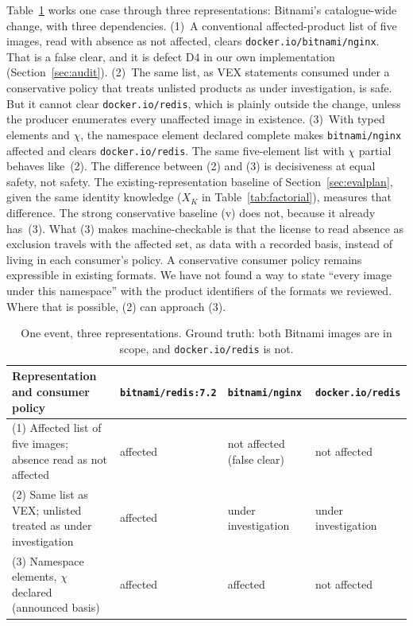 \documentclass[11pt,a4paper]{article}
\newcommand{\code}[1]{\texttt{#1}}
\begin{document}
Table~\ref{tab:vexcmp} works one case through three representations:
Bitnami's catalogue-wide change, with three dependencies. (1)~A
conventional affected-product list of five images, read with
absence as not affected, clears \code{docker.io/bitnami/nginx}. That is
a false clear, and it is defect D4 in our own implementation
(Section~\ref{sec:audit}). (2)~The same list, as VEX statements
consumed under a conservative policy that treats unlisted products as
under investigation, is safe. But it cannot clear
\code{docker.io/redis}, which is plainly outside the change, unless the
producer enumerates every unaffected image in existence. (3)~With typed
elements and $\chi$, the namespace element declared complete makes
\code{bitnami/nginx} affected and clears \code{docker.io/redis}. The
same five-element list with $\chi$ partial behaves like~(2). The
difference between (2) and (3) is decisiveness at equal safety, not
safety. The existing-representation baseline of
Section~\ref{sec:evalplan}, given the same identity knowledge
($X_K$ in Table~\ref{tab:factorial}), measures that difference. The strong
conservative baseline (v) does not, because it already has~(3). What (3) makes
machine-checkable is that the license to read absence as exclusion
travels with the affected set, as data with a recorded basis, instead
of living in each consumer's policy. A conservative consumer policy
remains expressible in existing formats. We have not found a way to
state ``every image under this namespace'' with the product
identifiers of the formats we reviewed. Where that is possible, (2)
can approach (3).

\begin{table}[t]
\centering
\footnotesize
\begin{tabularx}{\linewidth}{@{}>{\raggedright\arraybackslash}X >{\raggedright\arraybackslash}p{2.6cm} >{\raggedright\arraybackslash}p{2.6cm} >{\raggedright\arraybackslash}p{2.6cm}@{}}
\toprule
Representation and consumer policy & \code{bitnami/\allowbreak redis:7.2} & \code{bitnami/\allowbreak nginx} & \code{docker.io/\allowbreak redis} \\
\midrule
(1) Affected list of five images; absence read as not affected &
  affected & not affected (false clear) & not affected \\
(2) Same list as VEX; unlisted treated as under investigation &
  affected & under investigation & under investigation \\
(3) Namespace elements, $\chi$ declared (announced basis) &
  affected & affected & not affected \\
\bottomrule
\end{tabularx}
\caption{One event, three representations. Ground truth: both Bitnami
images are in scope, and \code{docker.io/redis} is not.}
\label{tab:vexcmp}
\end{table}
\end{document}
